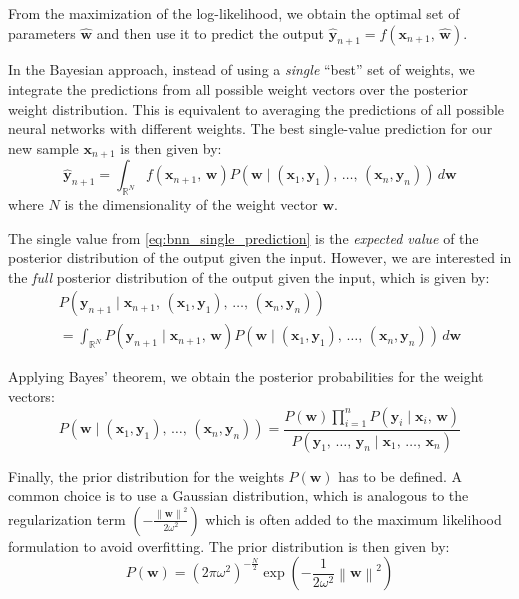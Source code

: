 From the maximization of the log-likelihood, we obtain the optimal set of parameters $\widehat{\textbf{w}}$ and then use it
to predict the output $\widehat{\textbf{y}}_{n+1} = f(\textbf{x}_{n+1},\,\widehat{\textbf{w}})$.

In the Bayesian approach, instead of using a \emph{single} ``best'' set of weights, we integrate the predictions from all possible
weight vectors over the posterior weight distribution. This is equivalent to averaging the predictions of all possible neural networks
with different weights. The best single-value prediction for our new sample $\textbf{x}_{n+1}$ is then given by:
\begin{equation}\label{eq:bnn_single_prediction}
    \widehat{\textbf{y}}_{n+1} = \int_{\mathds{R}^N}
        f(\textbf{x}_{n+1},\,\textbf{w})
        P(\textbf{w} \mid \left(\textbf{x}_1,  \textbf{y}_1 \right),\,\dots,\,\left(\textbf{x}_n,  \textbf{y}_n \right))
        \,d\textbf{w}
\end{equation}
where $N$ is the dimensionality of the weight vector $\textbf{w}$.

The single value from \cref{eq:bnn_single_prediction} is the \emph{expected value} of the posterior distribution of the output given the input.
However, we are interested in the \emph{full} posterior distribution of the output given the input, which is given by:
\begin{multline}\label{eq:bnn_posterior}
    P(\textbf{y}_{n+1} \mid \textbf{x}_{n+1},\,\left(\textbf{x}_1,  \textbf{y}_1 \right),\,\dots,\,\left(\textbf{x}_n,  \textbf{y}_n \right)) \\
        = \int_{\mathds{R}^N}
            P(\textbf{y}_{n+1} \mid \textbf{x}_{n+1},\,\textbf{w})
            P(\textbf{w} \mid \left(\textbf{x}_1,  \textbf{y}_1 \right),\,\dots,\,\left(\textbf{x}_n,  \textbf{y}_n \right))
            \,d\textbf{w}
\end{multline}

Applying Bayes' theorem, we obtain the posterior probabilities for the weight vectors:
\begin{equation}
    P(\textbf{w} \mid \left(\textbf{x}_1,  \textbf{y}_1 \right),\,\dots,\,\left(\textbf{x}_n,  \textbf{y}_n \right))
    = \frac{
        P(\textbf{w}) \prod_{i=1}^{n} P(\textbf{y}_i \mid \textbf{x}_i,\,\textbf{w})
    }{
        P(\textbf{y}_1,\,\dots,\,\textbf{y}_n \mid \textbf{x}_1,\,\dots,\,\textbf{x}_n)
    }
\end{equation}

Finally, the prior distribution for the weights $P(\textbf{w})$ has to be defined. A common choice is to use a Gaussian distribution,
which is analogous to the regularization term $\left(-\frac{\left\lVert \textbf{w} \right\rVert^2}{2\omega^2}\right)$ which is often added to the
maximum likelihood formulation to avoid overfitting. The prior distribution is then given by:
\begin{equation}
    P(\textbf{w}) = (2\pi\omega^2)^{-\frac{N}{2}} \exp \left( -\frac{1}{2\omega^2} \left\lVert \textbf{w} \right\rVert^2 \right)
\end{equation}

